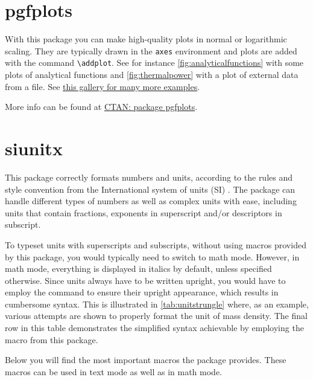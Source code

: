 \section{pgfplots}
With this package you can make high-quality plots in normal or logarithmic scaling. They are typically drawn in the \verb|axes| environment and plots are added with the command \verb|\addplot|. See for instance \cref{fig:analyticalfunctions} with some plots of analytical functions and \cref{fig:thermalpower} with a plot of external data from a file. See \href{http://pgfplots.sourceforge.net/gallery.html}{this gallery for many more examples}.

More info can be found at \href{https://ctan.org/pkg/pgfplots}{CTAN: package pgfplots}.

\section{siunitx}\label{sec:siunitx}
This package correctly formats numbers and units, according to the rules and style convention from the International system of units (SI) \parencite[section 5]{SI}. The package can handle different types of numbers as well as complex units with ease, including units that contain fractions, exponents in superscript and/or descriptors in subscript.

To typeset units with superscripts and subscripts, without using macros provided by this package, you would typically need to switch to math mode. However, in math mode, everything is displayed in italics by default, unless specified otherwise. Since units always have to be written upright, you would have to employ the  command to ensure their upright appearance, which results in cumbersome syntax. This is illustrated in \cref{tab:unitstrungle} where, as an example, various attempts are shown to properly format the unit of mass density. The final row in this table demonstrates the simplified syntax achievable by employing the  macro from this package.

Below you will find the most important macros the  package provides. These macros can be used in text mode as well as in math mode.

